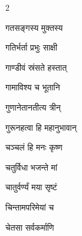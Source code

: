 \begin{multicols}{2}
\begin{indexlist}
\item गतसङ्गस्य मुक्तस्य \dotfill {}
\item गतिर्भर्ता प्रभुः साक्षी \dotfill {}
\item गाण्डीवं स्रंसते हस्तात् \dotfill {}
\item गामाविश्य च भूतानि \dotfill {}
\item गुणानेतानतीत्य त्रीन् \dotfill {}
\item गुरूनहत्वा हि महानुभावान् \dotfill {}
\end{indexlist}

\begin{indexlist}
\item चञ्चलं हि मनः कृष्ण \dotfill {}
\item चतुर्विधा भजन्ते मां \dotfill {}
\item चातुर्वर्ण्यं मया सृष्टं \dotfill {}
\item चिन्तामपरिमेयां च \dotfill {}
\item चेतसा सर्वकर्माणि \dotfill {}
\end{indexlist}


\end{multicols}
